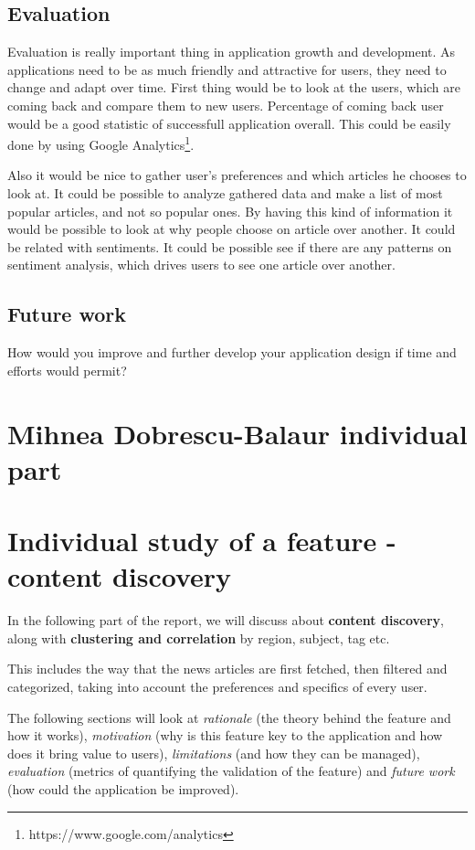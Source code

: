 \documentclass{acm_proc_10ptArticle-sp}
\begin{document}
\subsection{Evaluation}

Evaluation is really important thing in application growth and development. As applications need to be as much friendly and attractive for users, they need to change and adapt over time. First thing would be to look at the users, which are coming back and compare them to new users. Percentage of coming back user would be a good statistic of successfull application overall. This could be easily done by using Google Analytics\footnote{https://www.google.com/analytics}.

Also it would be nice to gather user's preferences and which articles he chooses to look at. It could be possible to analyze gathered data and make a list of most popular articles, and not so popular ones. By having this kind of information it would be possible to look at why people choose on article over another. It could be related with sentiments. It could be possible see if there are any patterns on sentiment analysis, which drives users to see one article over another.

\subsection{Future work}

How would you improve and further develop your application design if time  and efforts would permit?


\section{Mihnea Dobrescu-Balaur individual part}

\section{Individual study of a feature - content discovery}

In the following part of the report, we will discuss about \textbf{content discovery}, along with \textbf{clustering and correlation} by region, subject, tag etc.

This includes the way that the news articles are first fetched, then filtered and categorized, taking into account the preferences and specifics of every user.

The following sections will look at \textit{rationale} (the theory behind the feature and how it works), \textit{motivation} (why is this feature key to the application and how does it bring value to users), \textit{limitations} (and how they can be managed), \textit{evaluation} (metrics of quantifying the validation of the feature) and \textit{future work} (how could the application be improved).
\end{document}

